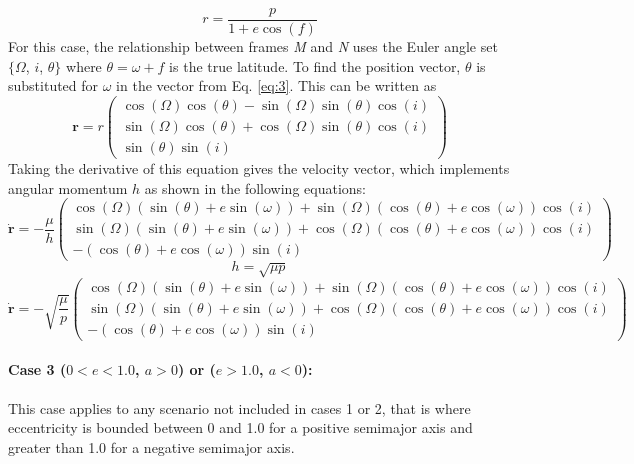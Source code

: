 \begin{equation} \label{eq:8}
r = \frac{p}{1+e\cos(f)}
\end{equation}
For this case, the relationship between frames \textit{M} and \textit{N} uses the Euler angle set $\{\Omega$, $i$, $\theta\}$ where $\theta = \omega + f$ is the true latitude.
To find the position vector, $\theta$ is substituted for $\omega$ in the vector from Eq. \ref{eq:3}. This can be written as
\begin{equation}\label{eq:9}
\bm{r} = r\begin{pmatrix}
\cos(\Omega)\cos(\theta)-\sin(\Omega)\sin(\theta)\cos(i) \\ \sin(\Omega)\cos(\theta)+\cos(\Omega)\sin(\theta)\cos(i) \\ \sin(\theta)\sin(i)
\end{pmatrix}
\end{equation}
Taking the derivative of this equation gives the velocity vector, which implements angular momentum $h$ as shown in the following equations:
\begin{equation}\label{eq:10}
\bm{\dot{r}} = -\frac{\mu}{h}\begin{pmatrix}
\cos(\Omega)(\sin(\theta)+e\sin(\omega))+\sin(\Omega)(\cos(\theta)+e\cos(\omega))\cos(i) \\ \sin(\Omega)(\sin(\theta)+e\sin(\omega))+\cos(\Omega)(\cos(\theta)+e\cos(\omega))\cos(i) \\ -(\cos(\theta)+e\cos(\omega))\sin(i)
\end{pmatrix}
\end{equation}
\begin{equation} \label{eq:11}
h = \sqrt{\mu p}
\end{equation}
\begin{equation}\label{eq:12}
\bm{\dot{r}} = -\sqrt{\frac{\mu}{p}}\begin{pmatrix}
\cos(\Omega)(\sin(\theta)+e\sin(\omega))+\sin(\Omega)(\cos(\theta)+e\cos(\omega))\cos(i) \\ \sin(\Omega)(\sin(\theta)+e\sin(\omega))+\cos(\Omega)(\cos(\theta)+e\cos(\omega))\cos(i) \\ -(\cos(\theta)+e\cos(\omega))\sin(i)
\end{pmatrix}
\end{equation}
\paragraph{Case 3 (\boldmath$0<e<1.0$, $a>0$) or ($e>1.0$, $a<0$):}
This case applies to any scenario not included in cases 1 or 2, that is where eccentricity is bounded between 0 and 1.0 for a positive semimajor axis and greater than 1.0 for a negative semimajor axis.

